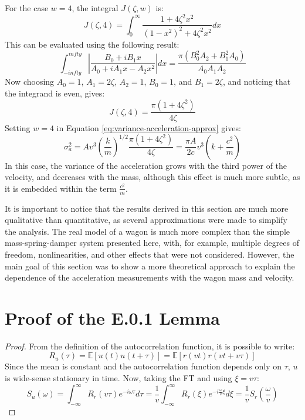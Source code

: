 For the case $w = 4$, the integral $J(\zeta, w)$ is:
\begin{equation}
    J(\zeta, 4) = \int_{0}^{\infty} \frac{1 + 4 \zeta^2 x^2}{(1 - x^2)^2 + 4 \zeta^2 x^2} dx
\end{equation}
This can be evaluated using the following result:
\begin{equation}
    \int_{-infty}^{infty} \left|\frac{B_0 + i B_1 x}{A_0 + i A_1 x - A_2 x^2}\right| dx = \frac{\pi(B_0^2 A_2+B_1^2 A_0)}{A_0 A_1 A_2}
\end{equation}
Now choosing $A_0 = 1$, $A_1 = 2\zeta$, $A_2 = 1$, $B_0 = 1$, and $B_1 = 2\zeta$, and noticing that the integrand is even, gives:
\begin{equation}
    J(\zeta, 4) = \frac{\pi(1 + 4\zeta^2)}{4\zeta}
\end{equation}
Setting $w = 4$ in Equation \ref{eq:variance-acceleration-approx} gives:
\begin{equation}
    \sigma^2_{a} = A v^3 \left(\frac{k}{m}\right)^{1/2} \frac{\pi(1 + 4\zeta^2)}{4\zeta} = \frac{\pi A}{2c} v^3 \left(k + \frac{c^2}{m}\right)
\end{equation}
In this case, the variance of the acceleration grows with the third power of the velocity, and decreases with the mass, although this effect is much more subtle, as it is embedded within the term $\frac{c^2}{m}$.

It is important to notice that the results derived in this section are much more qualitative than quantitative, as several approximations were made to simplify the analysis. The real model of a wagon is much more complex than the simple mass-spring-damper system presented here, with, for example, multiple degrees of freedom, nonlinearities, and other effects that were not considered. However, the main goal of this section was to show a more theoretical approach to explain the dependence of the acceleration measurements with the wagon mass and velocity.

\chapter{Proof of the E.0.1 Lemma} \label{appendix-f}

\begin{proof}
    From the definition of the autocorrelation function, it is possible to write:
    \begin{equation}
        R_u(\tau) = \mathbb{E}[u(t) u(t + \tau)] = \mathbb{E}[r(vt) r(vt + v\tau)]
    \end{equation}
    Since the mean is constant and the autocorrelation function depends only on $\tau$, $u$ is wide-sense stationary in time. Now, taking the FT and using $\xi = v\tau$:
    \begin{equation}
        S_u(\omega) = \int_{-\infty}^{\infty} R_r(v\tau) e^{-i\omega\tau} d\tau = \frac{1}{v} \int_{-\infty}^{\infty} R_r(\xi) e^{-i\frac{\omega}{v}\xi} d\xi = \frac{1}{v} S_r\left(\frac{\omega}{v}\right)
    \end{equation}
\end{proof}

